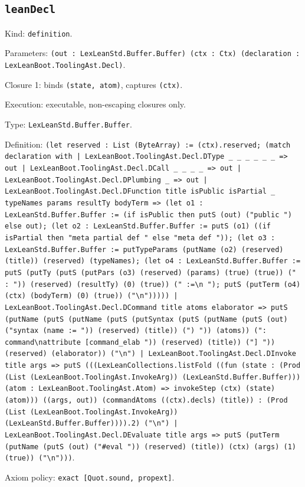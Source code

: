 \documentclass[11pt]{article}
\begin{document}
\subsection*{\texttt{leanDecl}}
\noindent Kind: \texttt{definition}.\par
\noindent Parameters: \texttt{(out : LexLeanStd.Buffer.Buffer) (ctx : Ctx) (declaration : LexLeanBoot.ToolingAst.Decl)}.\par
\noindent Closure 1: binds \texttt{(state, atom)}, captures \texttt{(ctx)}.\par
\noindent Execution: executable, non-escaping closures only.\par
\noindent Type: \texttt{LexLeanStd.Buffer.Buffer}.\par
\noindent Definition: \texttt{(let reserved : List (ByteArray) := (ctx).reserved; (match declaration with | LexLeanBoot.ToolingAst.Decl.DType \_ \_ \_ \_ \_ \_ => out | LexLeanBoot.ToolingAst.Decl.DCall \_ \_ \_ \_ => out | LexLeanBoot.ToolingAst.Decl.DPlumbing \_ => out | LexLeanBoot.ToolingAst.Decl.DFunction title isPublic isPartial \_ typeNames params resultTy bodyTerm => (let o1 : LexLeanStd.Buffer.Buffer := (if isPublic then putS (out) ("public ") else out); (let o2 : LexLeanStd.Buffer.Buffer := putS (o1) ((if isPartial then "meta partial def " else "meta def ")); (let o3 : LexLeanStd.Buffer.Buffer := putTypeParams (putName (o2) (reserved) (title)) (reserved) (typeNames); (let o4 : LexLeanStd.Buffer.Buffer := putS (putTy (putS (putPars (o3) (reserved) (params) (true) (true)) (" : ")) (reserved) (resultTy) (0) (true)) (" :=\textbackslash{}n  "); putS (putTerm (o4) (ctx) (bodyTerm) (0) (true)) ("\textbackslash{}n"))))) | LexLeanBoot.ToolingAst.Decl.DCommand title atoms elaborator => putS (putName (putS (putName (putS (putSyntax (putS (putName (putS (out) ("syntax (name := ")) (reserved) (title)) (") ")) (atoms)) (": command\textbackslash{}nattribute [command\_elab ")) (reserved) (title)) ("] ")) (reserved) (elaborator)) ("\textbackslash{}n") | LexLeanBoot.ToolingAst.Decl.DInvoke title args => putS (((LexLeanCollections.listFold ((fun (state : (Prod (List (LexLeanBoot.ToolingAst.InvokeArg)) (LexLeanStd.Buffer.Buffer))) (atom : LexLeanBoot.ToolingAst.Atom) => invokeStep (ctx) (state) (atom))) ((args, out)) (commandAtoms ((ctx).decls) (title)) : (Prod (List (LexLeanBoot.ToolingAst.InvokeArg)) (LexLeanStd.Buffer.Buffer)))).2) ("\textbackslash{}n") | LexLeanBoot.ToolingAst.Decl.DEvaluate title args => putS (putTerm (putName (putS (out) ("\#eval ")) (reserved) (title)) (ctx) (args) (1) (true)) ("\textbackslash{}n")))}.\par
\noindent Axiom policy: \texttt{exact [Quot.sound, propext]}.\par
\end{document}
